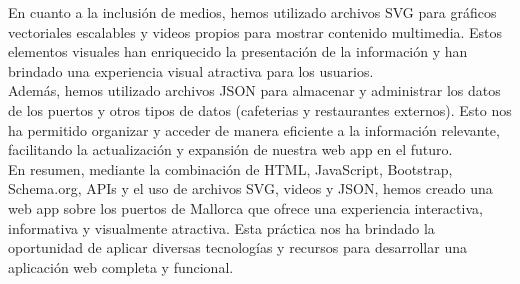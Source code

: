 \documentclass{article}
\begin{document}
\noindent En cuanto a la inclusión de medios, hemos utilizado archivos SVG para gráficos vectoriales escalables y videos propios para mostrar contenido multimedia. Estos elementos visuales han enriquecido la presentación de la información y han brindado una experiencia visual atractiva para los usuarios.\\

\noindent Además, hemos utilizado archivos JSON para almacenar y administrar los datos de los puertos y otros tipos de datos (cafeterias y restaurantes externos). Esto nos ha permitido organizar y acceder de manera eficiente a la información relevante, facilitando la actualización y expansión de nuestra web app en el futuro.\\

\noindent En resumen, mediante la combinación de HTML, JavaScript, Bootstrap, Schema.org, APIs y el uso de archivos SVG, videos y JSON, hemos creado una web app sobre los puertos de Mallorca que ofrece una experiencia interactiva, informativa y visualmente atractiva. Esta práctica nos ha brindado la oportunidad de aplicar diversas tecnologías y recursos para desarrollar una aplicación web completa y funcional.
\end{document}
